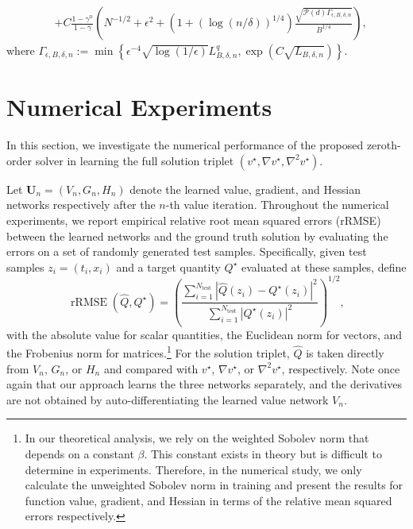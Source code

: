\documentclass[twoside,11pt]{article}
\newcommand{\1}{\mathbf{1}}
\numberwithin{equation}{section}
\begin{document}
\begin{theorem}
\begin{enumerate}[(a)]
\begin{equation}
\begin{aligned}
    &+ C\frac{1-\gamma^n}{1-\gamma}\left( N^{-1/2} + \epsilon^2 + \left(1+(\log(n/\delta))^{1/4}\right)
        \frac{\sqrt{\mathcal P(d)\Gamma_{\epsilon,B,\delta,n}}}{B^{1/4}}\right),
    \end{aligned}
\end{equation}
where $\Gamma_{\epsilon,B,\delta,n}
        :=
        \min\left\{
        \epsilon^{-4}\sqrt{\log(1/\epsilon)}L_{B,\delta,n}^{q},
        \exp\!\left(C\sqrt{L_{B,\delta,n}}\right)
        \right\}$. 
 \end{enumerate}
\end{theorem}


\section{Numerical Experiments}
\label{sec:numerical_experiments}

In this section, we investigate the numerical performance of the proposed zeroth-order solver in learning the full solution triplet
$(v^\star,\nabla v^\star,\nabla^2 v^\star)$.


Let $\mathbf U_n=(V_n,G_n,H_n)$ denote the learned value, gradient, and Hessian networks respectively after the $n$-th value iteration. Throughout the numerical experiments, we report empirical relative root mean squared errors (rRMSE) between the learned networks and the ground truth solution by evaluating the errors on a set of randomly generated test samples. Specifically, given test samples $z_i=(t_i,x_i)$ and a target quantity $Q^\star$ evaluated at these samples, define
\begin{equation}
    \operatorname{rRMSE}(\widehat Q,Q^\star)
    =
    \left(
    \frac{\sum_{i=1}^{N_{\mathrm{test}}}
    \left|\widehat Q(z_i)-Q^\star(z_i)\right|^2}
    {\sum_{i=1}^{N_{\mathrm{test}}}
    \left|Q^\star(z_i)\right|^2}
    \right)^{1/2},
    \label{eq:numexp_rrmse}
\end{equation}
with the absolute value for scalar quantities, the Euclidean norm for vectors, and the Frobenius norm for matrices.\footnote{In our theoretical analysis, we rely on the weighted Sobolev norm that depends on a constant $\beta$. This constant exists in theory but is difficult to determine in experiments. Therefore, in the numerical study, we only calculate the unweighted Sobolev norm in training and present the results for function value, gradient, and Hessian in terms of the relative mean squared errors respectively.} For the solution triplet, $\widehat Q$ is taken directly from $V_n$, $G_n$, or $H_n$ and compared with $v^\star$, $\nabla v^\star$, or $\nabla^2v^\star$, respectively. Note once again that our approach learns the three networks separately, and the derivatives are not obtained by auto-differentiating the learned value network $V_n$.
\end{document}
